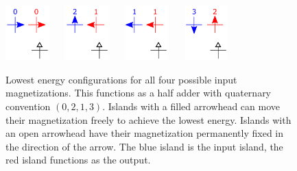 \documentclass[twocolumn]{phdsymp}
\newcommand{\rulesep}{\unskip\ \vrule\ }
\begin{document}
\begin{figure}
\centering
\includegraphics[width=0.15\textwidth]{Figures/HalfAdderConcept/Input 0 deg.pdf}
\rulesep
\includegraphics[width=0.15\textwidth]{Figures/HalfAdderConcept/Input 90 deg.pdf}
\rulesep
\includegraphics[width=0.15\textwidth]{Figures/HalfAdderConcept/Input 180 deg.pdf}
\rulesep
\includegraphics[width=0.15\textwidth]{Figures/HalfAdderConcept/Input 270 deg.pdf}
\caption{Lowest energy configurations for all four possible input magnetizations. This functions as a half adder with quaternary convention $(0,2,1,3)$. Islands with a filled arrowhead can move their magnetization freely to achieve the lowest energy. Islands with an open arrowhead have their magnetization permanently fixed in the direction of the arrow. The blue island is the input island, the red island functions as the output.}
\label{fig:EA_HalfAdderConcept1}
\end{figure}
\end{document}
